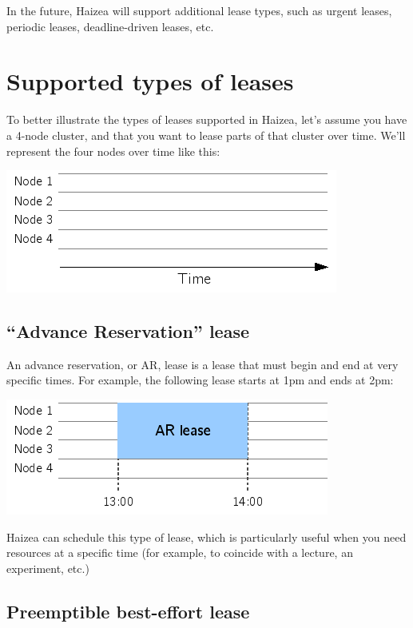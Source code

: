 In the future, Haizea will support additional lease types, such as urgent leases, periodic leases, deadline-driven leases, etc.

\section{Supported types of leases}

To better illustrate the types of leases supported in Haizea, let's assume you have a 4-node cluster, and that you want to lease parts of that cluster over time. We'll represent the four nodes over time like this:

\begin{center}
\includegraphics{images/quickstart_leasegraph1.png}
\end{center}

\subsection{``Advance Reservation'' lease}

An advance reservation, or AR, lease is a lease that must begin and end at very specific times. For example, the following lease starts at 1pm and ends at 2pm:

\begin{center}
\includegraphics{images/lease_ar.png}
\end{center}

Haizea can schedule this type of lease, which is particularly useful when you need resources at a specific time (for example, to coincide with a lecture, an experiment, etc.)

\subsection{Preemptible best-effort lease}

